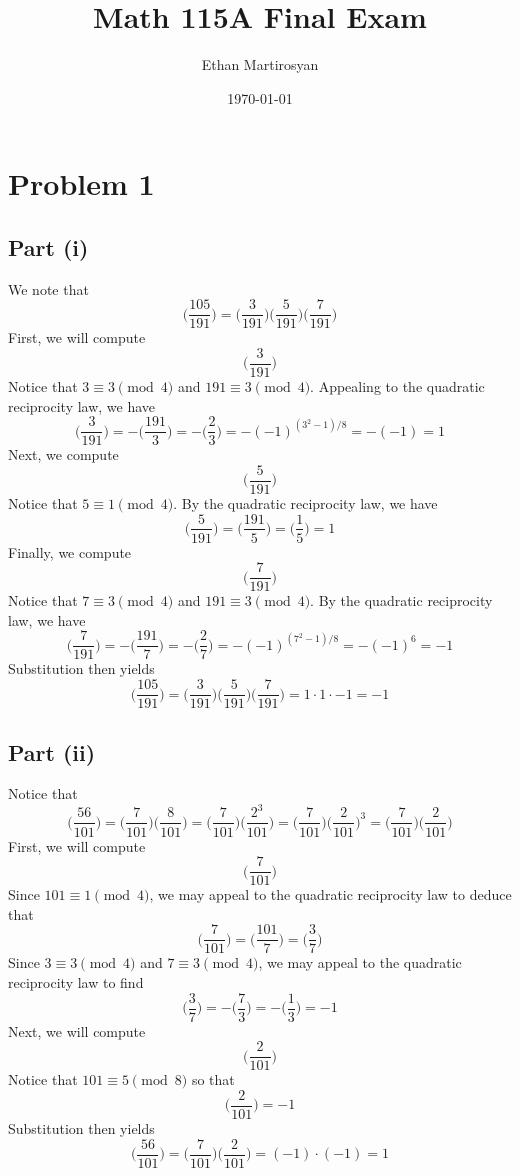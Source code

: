 \documentclass[12pt]{article}
\begin{document}
 
\title{Math 115A Final Exam}
\author{Ethan Martirosyan}
\date{\today}
\maketitle
{}
\hfuzz=50pt
\section*{Problem 1}
\subsection*{Part (i)}
We note that
\[
\bigg(\frac{105}{191}\bigg) = \bigg(\frac{3}{191}\bigg)\bigg(\frac{5}{191}\bigg)\bigg(\frac{7}{191}\bigg)
\] First, we will compute 
\[
\bigg(\frac{3}{191}\bigg)
\] Notice that $3 \equiv 3 \pmod{4}$ and $191 \equiv 3 \pmod{4}$. Appealing to the quadratic reciprocity law, we have
\[
\bigg(\frac{3}{191}\bigg) = -\bigg(\frac{191}{3}\bigg) = -\bigg(\frac{2}{3}\bigg) = -(-1)^{(3^2-1)/8} = -(-1) = 1
\] Next, we compute
\[
\bigg(\frac{5}{191}\bigg)
\] Notice that $5 \equiv 1\pmod{4}$. By the quadratic reciprocity law, we have
\[
\bigg(\frac{5}{191}\bigg) = \bigg(\frac{191}{5}\bigg) = \bigg(\frac{1}{5}\bigg) = 1
\] Finally, we compute
\[
\bigg(\frac{7}{191}\bigg)
\] Notice that $7 \equiv 3 \pmod{4}$ and $191 \equiv 3 \pmod{4}$. By the quadratic reciprocity law, we have
\[
\bigg(\frac{7}{191}\bigg) = -\bigg(\frac{191}{7}\bigg) = -\bigg(\frac{2}{7}\bigg) = - (-1)^{(7^2-1)/8} = -(-1)^{6} = -1
\] Substitution then yields
\[
\bigg(\frac{105}{191}\bigg) = \bigg(\frac{3}{191}\bigg)\bigg(\frac{5}{191}\bigg)\bigg(\frac{7}{191}\bigg) = 1 \cdot 1 \cdot - 1 = - 1
\]
\newpage
\subsection*{Part (ii)}
Notice that
\[
\bigg(\frac{56}{101}\bigg) = \bigg(\frac{7}{101}\bigg) \bigg(\frac{8}{101}\bigg) = \bigg(\frac{7}{101}\bigg) \bigg(\frac{2^3}{101}\bigg) = \bigg(\frac{7}{101}\bigg) \bigg(\frac{2}{101}\bigg)^3 = \bigg(\frac{7}{101}\bigg) \bigg(\frac{2}{101}\bigg)
\] First, we will compute
\[
\bigg(\frac{7}{101}\bigg)
\] Since $101 \equiv 1 \pmod{4}$, we may appeal to the quadratic reciprocity law to deduce that
\[
\bigg(\frac{7}{101}\bigg) = \bigg(\frac{101}{7}\bigg) = \bigg(\frac{3}{7}\bigg)
\] Since $3 \equiv 3 \pmod{4}$ and $7 \equiv 3 \pmod{4}$, we may appeal to the quadratic reciprocity law to find
\[
\bigg(\frac{3}{7}\bigg) = -\bigg(\frac{7}{3}\bigg) = -\bigg(\frac{1}{3}\bigg) = -1
\] Next, we will compute 
\[
\bigg(\frac{2}{101}\bigg)
\] Notice that $101 \equiv 5 \pmod{8}$ so that
\[
\bigg(\frac{2}{101}\bigg) = - 1
\] Substitution then yields
\[
\bigg(\frac{56}{101}\bigg) = \bigg(\frac{7}{101}\bigg) \bigg(\frac{2}{101}\bigg) = (-1)\cdot (-1) = 1
\]
\newpage
\end{document}
